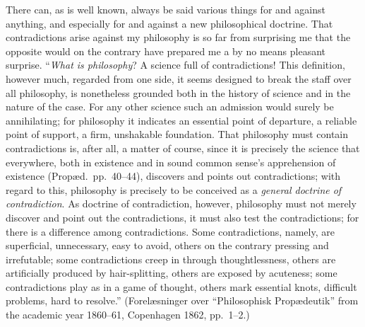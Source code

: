 \documentclass[12pt]{book}
\newcommand{\opage}[1]{\marginnote{\footnotesize\textit{[#1]}}}
\begin{document}
There can, as is well known, always be said various things for and
against anything, and especially for and against a new philosophical
doctrine. That contradictions arise against my philosophy is so far from
surprising me that the opposite would on the contrary have prepared me a
by no means pleasant surprise. ``\emph{What is philosophy}? A science full
of contradictions! This definition, however much, regarded from one side,
it seems designed to break the staff over all philosophy, is nonetheless
grounded both in the history of science and in the nature of the case.
For any other science such an admission would surely be annihilating; for
philosophy it indicates an essential point of departure, a reliable point
of support, a firm, unshakable foundation. That philosophy must contain
contradictions is, after all, a matter of course, since it is precisely
the science that everywhere, both in existence and in sound common sense's
apprehension of existence (Propæd.\ pp.~40--44), discovers and points out
contradictions; with regard to this, philosophy is precisely to be
conceived as a \emph{general doctrine of contradiction}. As doctrine of
contradiction, however, philosophy must not merely discover and point out
the contradictions, it must also test the contradictions; for there is a
difference among contradictions. Some contradictions, namely, are
superficial, unnecessary, easy to avoid, others on the contrary pressing
and irrefutable; some contradictions creep in through thoughtlessness,
others are artificially produced by hair-splitting, others are exposed
\opage{324}\setcounter{footnote}{0}%
by acuteness; some contradictions play as in a game of thought, others
mark essential knots, difficult problems, hard to resolve.'' (Forelæsninger
over ``Philosophisk Propædeutik'' from the academic year 1860--61,
Copenhagen 1862, pp.~1--2.)
\end{document}
